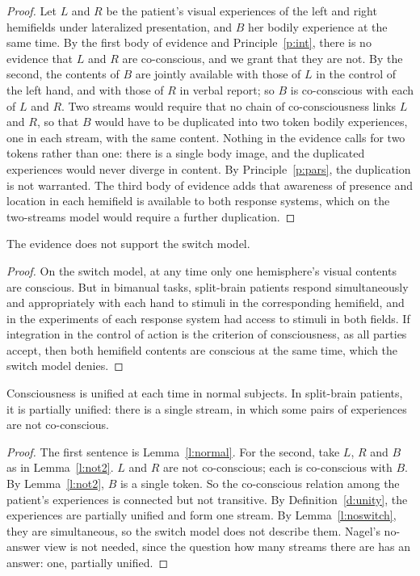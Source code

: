 \documentclass{situationist-preprint}
\begin{document}
\begin{proof}
Let $L$ and $R$ be the patient's visual experiences of the left and right hemifields under lateralized presentation, and $B$ her bodily experience at the same time. By the first body of evidence and Principle~\ref{p:int}, there is no evidence that $L$ and $R$ are co-conscious, and we grant that they are not. By the second, the contents of $B$ are jointly available with those of $L$ in the control of the left hand, and with those of $R$ in verbal report; so $B$ is co-conscious with each of $L$ and $R$. Two streams would require that no chain of co-consciousness links $L$ and $R$, so that $B$ would have to be duplicated into two token bodily experiences, one in each stream, with the same content. Nothing in the evidence calls for two tokens rather than one: there is a single body image, and the duplicated experiences would never diverge in content. By Principle~\ref{p:pars}, the duplication is not warranted. The third body of evidence adds that awareness of presence and location in each hemifield is available to both response systems, which on the two-streams model would require a further duplication.
\end{proof}

\begin{lemma}\label{l:noswitch}
The evidence does not support the switch model.
\end{lemma}

\begin{proof}
On the switch model, at any time only one hemisphere's visual contents are conscious. But in bimanual tasks, split-brain patients respond simultaneously and appropriately with each hand to stimuli in the corresponding hemifield, and in the experiments of \citet{Pinto2017} each response system had access to stimuli in both fields. If integration in the control of action is the criterion of consciousness, as all parties accept, then both hemifield contents are conscious at the same time, which the switch model denies.
\end{proof}

\begin{theorem}\label{t:main}
Consciousness is unified at each time in normal subjects. In split-brain patients, it is partially unified: there is a single stream, in which some pairs of experiences are not co-conscious.
\end{theorem}

\begin{proof}
The first sentence is Lemma~\ref{l:normal}. For the second, take $L$, $R$ and $B$ as in Lemma~\ref{l:not2}. $L$ and $R$ are not co-conscious; each is co-conscious with $B$. By Lemma~\ref{l:not2}, $B$ is a single token. So the co-conscious relation among the patient's experiences is connected but not transitive. By Definition~\ref{d:unity}, the experiences are partially unified and form one stream. By Lemma~\ref{l:noswitch}, they are simultaneous, so the switch model does not describe them. Nagel's no-answer view is not needed, since the question how many streams there are has an answer: one, partially unified.
\end{proof}
\end{document}

